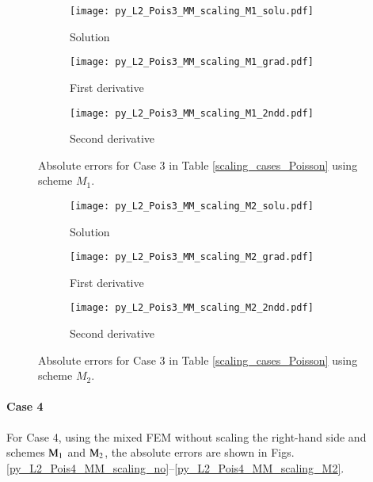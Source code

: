 \documentclass[review,3p]{elsarticle}
\begin{document}
\begin{figure}[!ht]
    \begin{subfigure}{5.5cm}
        \texttt{[image: py\_L2\_Pois3\_MM\_scaling\_M1\_solu.pdf]}
        \caption{Solution}
        \label{py_L2_Pois3_MM_scaling_M1_solu}
    \end{subfigure}
    \hspace{-0.2cm}
    \begin{subfigure}{5.5cm}
        \texttt{[image: py\_L2\_Pois3\_MM\_scaling\_M1\_grad.pdf]}
        \caption{First derivative}
        \label{py_L2_Pois3_MM_scaling_M1_grad}
    \end{subfigure}
    \hspace{-0.2cm}
    \begin{subfigure}{5.5cm}
        \texttt{[image: py\_L2\_Pois3\_MM\_scaling\_M1\_2ndd.pdf]}
        \caption{Second derivative}
        \label{py_L2_Pois3_MM_scaling_M1_2ndd}
    \end{subfigure}
\caption{Absolute errors for Case 3 in Table \ref{scaling_cases_Poisson} using scheme $M_1$.}
\label{py_L2_Pois3_MM_scaling_M1}
\end{figure}

\begin{figure}[!ht]
    \begin{subfigure}{5.5cm}
        \texttt{[image: py\_L2\_Pois3\_MM\_scaling\_M2\_solu.pdf]}
        \caption{Solution}
        \label{py_L2_Pois3_MM_scaling_M2_solu}
    \end{subfigure}
    \hspace{-0.2cm}
    \begin{subfigure}{5.5cm}
        \texttt{[image: py\_L2\_Pois3\_MM\_scaling\_M2\_grad.pdf]}
        \caption{First derivative}
        \label{py_L2_Pois3_MM_scaling_M2_grad}
    \end{subfigure}
    \hspace{-0.2cm}
    \begin{subfigure}{5.5cm}
        \texttt{[image: py\_L2\_Pois3\_MM\_scaling\_M2\_2ndd.pdf]}
        \caption{Second derivative}
        \label{py_L2_Pois3_MM_scaling_M2_2ndd}
    \end{subfigure}
\caption{Absolute errors for Case 3 in Table \ref{scaling_cases_Poisson} using scheme $M_2$.}
\label{py_L2_Pois3_MM_scaling_M2}
\end{figure}

\newpage
\paragraph{Case 4}
For Case 4, using the mixed FEM without scaling the right-hand side and schemes ${\rm M}_1$ and ${\rm M}_2$, the absolute errors are shown in Figs. \ref{py_L2_Pois4_MM_scaling_no}--\ref{py_L2_Pois4_MM_scaling_M2}.
\end{document}
